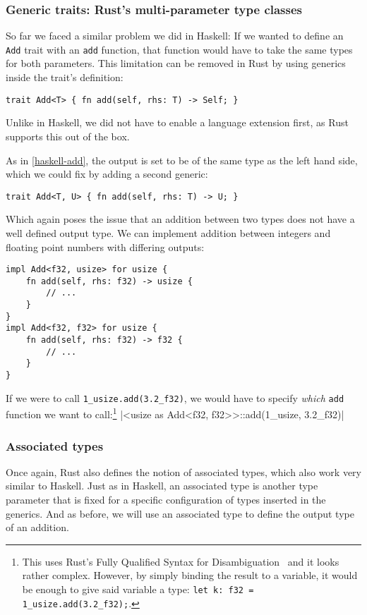 \subsubsection{Generic traits: Rust's multi-parameter type classes}

So far we faced a similar problem we did in Haskell: If we wanted to define an \verb|Add| trait with an \verb|add| function, that function would have to take the same types for both parameters. This limitation can be removed in Rust by using generics inside the trait's definition:
\begin{verbatim}
trait Add<T> { fn add(self, rhs: T) -> Self; }
\end{verbatim}
Unlike in Haskell, we did not have to enable a language extension first, as Rust supports this out of the box.

As in \autoref{haskell-add}, the output is set to be of the same type as the left hand side, which we could fix by adding a second generic:
\begin{verbatim}
trait Add<T, U> { fn add(self, rhs: T) -> U; }
\end{verbatim}
Which again poses the issue that an addition between two types does not have a well defined output type. We can implement addition between integers and floating point numbers with differing outputs:
\begin{verbatim}
impl Add<f32, usize> for usize {
    fn add(self, rhs: f32) -> usize {
        // ...
    }
}
impl Add<f32, f32> for usize {
    fn add(self, rhs: f32) -> f32 {
        // ...
    }
}
\end{verbatim}
If we were to call \verb|1_usize.add(3.2_f32)|, we would have to specify \emph{which} \verb|add| function we want to call:\footnote{This uses Rust's Fully Qualified Syntax for Disambiguation~\cite[Chapter~19.2]{rust-book} and it looks rather complex. However, by simply binding the result to a variable, it would be enough to give said variable a type: \verb|let k: f32 = 1_usize.add(3.2_f32);|.}
|<usize as Add<f32, f32>>::add(1_usize, 3.2_f32)|

\subsubsection{Associated types}\label{rust-associated-types}

Once again, Rust also defines the notion of associated types, which also work very similar to Haskell. Just as in Haskell, an associated type is another type parameter that is fixed for a specific configuration of types inserted in the generics. And as before, we will use an associated type to define the output type of an addition.

